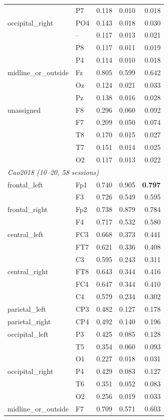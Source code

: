 \begin{table}[htbp]
\begin{tabular}{llrrr}
 & P7 & 0.118 & 0.010 & 0.018 \\
occipital\_right & PO4 & 0.143 & 0.018 & 0.030 \\
 & -- & 0.117 & 0.013 & 0.021 \\
 & P8 & 0.117 & 0.011 & 0.019 \\
 & P4 & 0.114 & 0.010 & 0.018 \\
midline\_or\_outside & Fz & 0.805 & 0.599 & 0.642 \\
 & Oz & 0.124 & 0.021 & 0.033 \\
 & Pz & 0.138 & 0.016 & 0.028 \\
unassigned & F8 & 0.296 & 0.060 & 0.092 \\
 & F7 & 0.209 & 0.050 & 0.074 \\
 & T8 & 0.170 & 0.015 & 0.027 \\
 & T7 & 0.151 & 0.014 & 0.025 \\
 & O2 & 0.117 & 0.013 & 0.022 \\
\midrule
\multicolumn{5}{l}{\textit{Cao2018 (10--20, 58 sessions)}} \\[2pt]
frontal\_left & Fp1 & 0.740 & 0.905 & \textbf{0.797} \\
 & F3 & 0.726 & 0.549 & 0.595 \\
frontal\_right & Fp2 & 0.738 & 0.879 & 0.784 \\
 & F4 & 0.717 & 0.532 & 0.580 \\
central\_left & FC3 & 0.668 & 0.373 & 0.441 \\
 & FT7 & 0.621 & 0.336 & 0.408 \\
 & C3 & 0.595 & 0.243 & 0.311 \\
central\_right & FT8 & 0.643 & 0.344 & 0.416 \\
 & FC4 & 0.647 & 0.344 & 0.410 \\
 & C4 & 0.579 & 0.234 & 0.302 \\
parietal\_left & CP3 & 0.482 & 0.127 & 0.178 \\
parietal\_right & CP4 & 0.492 & 0.140 & 0.196 \\
occipital\_left & P3 & 0.425 & 0.085 & 0.128 \\
 & T5 & 0.354 & 0.060 & 0.093 \\
 & O1 & 0.227 & 0.018 & 0.031 \\
occipital\_right & P4 & 0.429 & 0.083 & 0.127 \\
 & T6 & 0.351 & 0.052 & 0.083 \\
 & O2 & 0.256 & 0.019 & 0.033 \\
midline\_or\_outside & F7 & 0.709 & 0.571 & 0.603 \\

\end{tabular}
\end{table}

